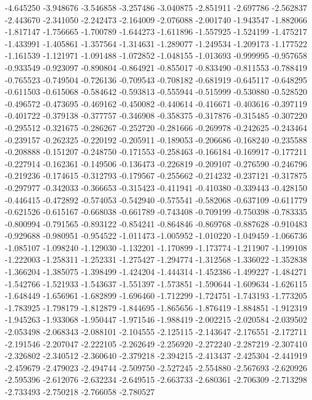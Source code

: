 -4.645250
-3.948676
-3.546858
-3.257486
-3.040875
-2.851911
-2.697786
-2.562837
-2.443670
-2.341050
-2.242473
-2.164009
-2.076088
-2.001740
-1.943547
-1.882066
-1.817147
-1.756665
-1.700789
-1.644273
-1.611896
-1.557925
-1.524199
-1.475217
-1.433991
-1.405861
-1.357564
-1.314631
-1.289077
-1.249534
-1.209173
-1.177522
-1.161539
-1.121971
-1.091488
-1.072852
-1.048155
-1.013693
-0.999995
-0.957658
-0.933549
-0.923097
-0.890804
-0.864921
-0.855017
-0.833490
-0.811553
-0.788419
-0.765523
-0.749504
-0.726136
-0.709543
-0.708182
-0.681919
-0.645117
-0.648295
-0.611503
-0.615068
-0.584642
-0.593813
-0.555944
-0.515999
-0.530880
-0.528520
-0.496572
-0.473695
-0.469162
-0.450082
-0.440614
-0.416671
-0.403616
-0.397119
-0.401722
-0.379138
-0.377757
-0.346908
-0.358375
-0.317876
-0.315485
-0.307220
-0.295512
-0.321675
-0.286267
-0.252720
-0.281666
-0.269978
-0.242625
-0.243464
-0.239157
-0.262325
-0.220192
-0.205911
-0.189053
-0.206686
-0.168240
-0.235588
-0.208888
-0.151207
-0.248750
-0.171553
-0.258463
-0.166184
-0.169917
-0.177211
-0.227914
-0.162361
-0.149506
-0.136473
-0.226819
-0.209107
-0.276590
-0.246796
-0.219236
-0.174615
-0.312793
-0.179567
-0.255662
-0.214232
-0.237121
-0.317875
-0.297977
-0.342033
-0.366653
-0.315423
-0.411941
-0.410380
-0.339443
-0.428150
-0.446415
-0.472892
-0.574053
-0.542940
-0.575541
-0.582068
-0.637109
-0.611779
-0.621526
-0.615167
-0.668038
-0.661789
-0.743408
-0.709199
-0.750398
-0.783335
-0.800994
-0.791565
-0.893122
-0.854241
-0.864846
-0.869768
-0.887628
-0.910483
-0.929688
-0.980951
-0.954522
-1.011473
-1.005952
-1.010220
-1.049459
-1.066736
-1.085107
-1.098240
-1.129030
-1.132201
-1.170899
-1.173774
-1.211907
-1.199108
-1.222003
-1.258311
-1.252331
-1.275427
-1.294774
-1.312568
-1.336022
-1.352838
-1.366204
-1.385075
-1.398499
-1.424204
-1.444314
-1.452386
-1.499227
-1.484271
-1.542766
-1.521933
-1.543637
-1.551397
-1.573851
-1.590644
-1.609634
-1.626115
-1.648449
-1.656961
-1.682899
-1.696460
-1.712299
-1.724751
-1.743193
-1.773205
-1.783925
-1.798179
-1.812879
-1.844695
-1.865656
-1.876419
-1.884851
-1.912319
-1.945263
-1.933068
-1.950447
-1.971546
-1.988419
-2.002215
-2.020584
-2.039502
-2.053498
-2.068343
-2.088101
-2.104555
-2.125115
-2.143647
-2.176551
-2.172711
-2.191546
-2.207047
-2.222105
-2.262649
-2.256920
-2.272240
-2.287219
-2.307410
-2.326802
-2.340512
-2.360640
-2.379218
-2.394215
-2.413437
-2.425304
-2.441919
-2.459679
-2.479023
-2.494744
-2.509750
-2.527245
-2.554880
-2.567693
-2.620926
-2.595396
-2.612076
-2.632234
-2.649515
-2.663733
-2.680361
-2.706309
-2.713298
-2.733493
-2.750218
-2.766058
-2.780527
